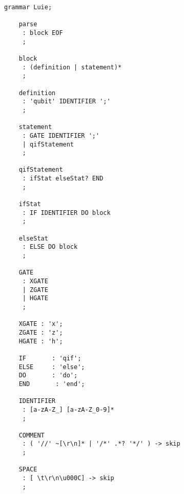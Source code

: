\begin{appendices}


\begin{lstlisting}[style=ANTLR]
    grammar Luie;
    
    parse
     : block EOF
     ;
    
    block
     : (definition | statement)*
     ;
    
    definition
     : 'qubit' IDENTIFIER ';'
     ;
    
    statement
     : GATE IDENTIFIER ';'
     | qifStatement 
     ;
    
    qifStatement
     : ifStat elseStat? END
     ;
     
    ifStat
     : IF IDENTIFIER DO block
     ;
    
    elseStat
     : ELSE DO block
     ;
    
    GATE
     : XGATE
     | ZGATE
     | HGATE
     ;
    
    XGATE : 'x';
    ZGATE : 'z';
    HGATE : 'h';
    
    IF       : 'qif';
    ELSE     : 'else';
    DO       : 'do';
    END       : 'end';
    
    IDENTIFIER 
     : [a-zA-Z_] [a-zA-Z_0-9]*
     ;
    
    COMMENT
     : ( '//' ~[\r\n]* | '/*' .*? '*/' ) -> skip
     ;
    
    SPACE
     : [ \t\r\n\u000C] -> skip
     ;
\end{lstlisting}

\end{appendices}